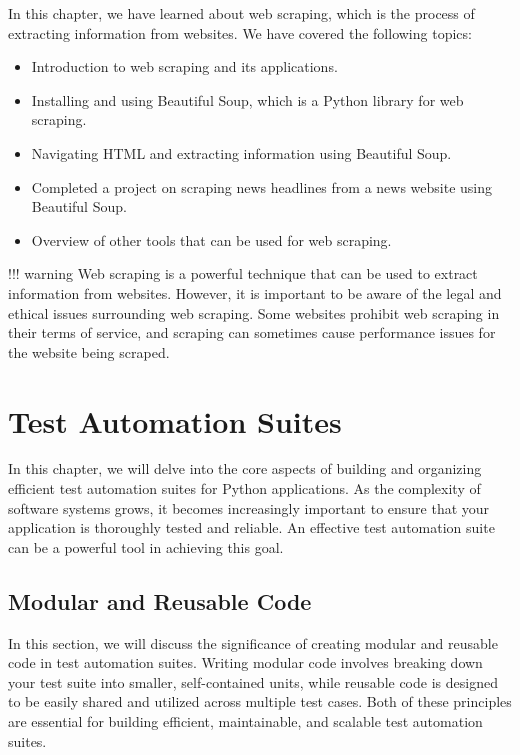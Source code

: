 \documentclass[
  paper=a4,
  ,captions=tableheading
]{scrartcl}
\providecommand{\tightlist}{%
  \setlength{\itemsep}{0pt}\setlength{\parskip}{0pt}}
\begin{document}
In this chapter, we have learned about web scraping, which is the
process of extracting information from websites. We have covered the
following topics:

\begin{itemize}
\tightlist
\item
  Introduction to web scraping and its applications.
\item
  Installing and using Beautiful Soup, which is a Python library for web
  scraping.
\item
  Navigating HTML and extracting information using Beautiful Soup.
\item
  Completed a project on scraping news headlines from a news website
  using Beautiful Soup.
\item
  Overview of other tools that can be used for web scraping.
\end{itemize}

!!! warning Web scraping is a powerful technique that can be used to
extract information from websites. However, it is important to be aware
of the legal and ethical issues surrounding web scraping. Some websites
prohibit web scraping in their terms of service, and scraping can
sometimes cause performance issues for the website being scraped.

\hypertarget{test-automation-suites}{%
\chapter{Test Automation Suites}\label{test-automation-suites}}

In this chapter, we will delve into the core aspects of building and
organizing efficient test automation suites for Python applications. As
the complexity of software systems grows, it becomes increasingly
important to ensure that your application is thoroughly tested and
reliable. An effective test automation suite can be a powerful tool in
achieving this goal.

\hypertarget{modular-and-reusable-code}{%
\section{Modular and Reusable Code}\label{modular-and-reusable-code}}

In this section, we will discuss the significance of creating modular
and reusable code in test automation suites. Writing modular code
involves breaking down your test suite into smaller, self-contained
units, while reusable code is designed to be easily shared and utilized
across multiple test cases. Both of these principles are essential for
building efficient, maintainable, and scalable test automation suites.
\end{document}
